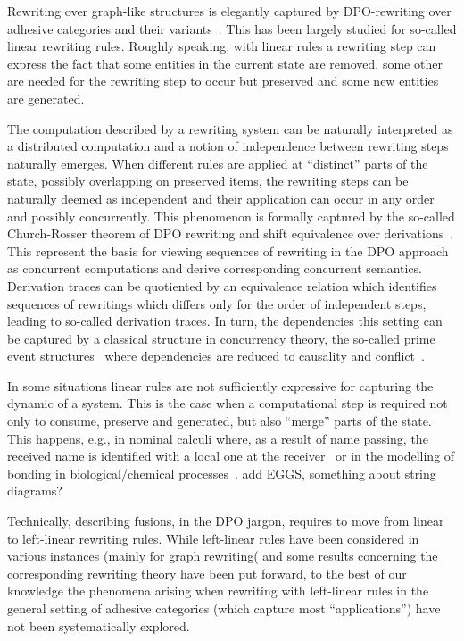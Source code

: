 \documentclass[a4paper]{article}
\theoremstyle{definition}
\begin{document}
Rewriting over graph-like structures is elegantly captured by
DPO-rewriting over adhesive categories and their
variants~\cite{lack2005adhesive,ehrig2006weak}.  This has been largely
studied for so-called linear rewriting rules. Roughly speaking, with
linear rules a rewriting step can express the fact that some entities
in the current state are removed, some other are needed for the
rewriting step to occur but preserved and some new entities are
generated.

The computation described by a rewriting system can be naturally
interpreted as a distributed computation and a notion of independence
between rewriting steps naturally emerges. When different rules are
applied at ``distinct'' parts of the state, possibly overlapping on
preserved items, the rewriting steps can be naturally deemed as
independent and their application can occur in any order and possibly
concurrently. This phenomenon is formally captured by the so-called
Church-Rosser theorem of DPO rewriting and shift equivalence over derivations~\cite{CMREHL:AAGT}. This represent the basis for
viewing sequences of rewriting in the DPO approach as concurrent
computations and derive corresponding concurrent semantics. Derivation
traces can be quotiented by an equivalence relation which identifies
sequences of rewritings which differs only for the order of
independent steps, leading to so-called derivation traces. In turn,
the dependencies this setting can be captured by a classical structure
in concurrency theory, the so-called prime event structures~\cite{NPW:PNES} where
dependencies are reduced to causality and conflict~\cite{Handbook,Bal:PhD,Sch:RRSG}.


In some situations linear rules are not sufficiently expressive for capturing the dynamic of a system. This is the case when  a computational step is required not only to consume, preserve and generated, but also ``merge'' parts of the state. This happens, e.g.,
in nominal calculi where, as a result of name passing,
the received name is identified with a local one at the
receiver~\cite{CVY:ESSPE,Gad07} or in the modelling of bonding in biological/chemical processes~\cite{PUY:MBPE}.
 add EGGS, something about string diagrams?

Technically, describing fusions, in the DPO jargon, requires to move from linear to left-linear rewriting rules. While left-linear rules have been considered in various instances (mainly for graph rewriting( and some results concerning the corresponding rewriting theory have been put forward, to the best of our knowledge the phenomena arising when rewriting with left-linear rules in the general setting of adhesive categories (which capture most ``applications'') have not been systematically explored.
\end{document}
